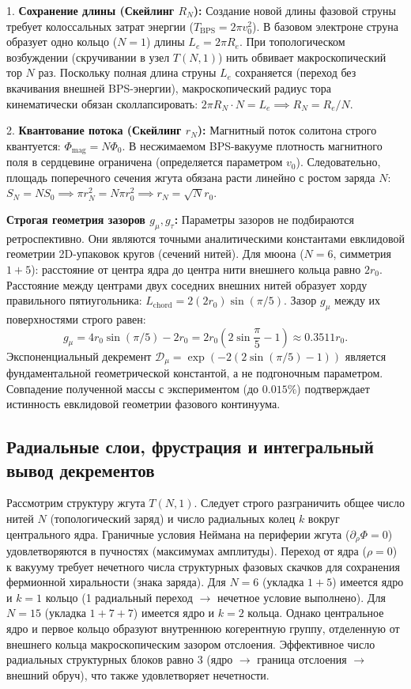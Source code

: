 \documentclass[12pt,a4paper]{article}
\begin{document}
1. \textbf{Сохранение длины (Скейлинг $R_N$):} Создание новой длины фазовой струны требует колоссальных затрат энергии ($T_{\text{BPS}} = 2\pi v_0^2$). В базовом электроне струна образует одно кольцо ($N=1$) длины $L_e = 2\pi R_e$. При топологическом возбуждении (скручивании в узел $T(N,1)$) нить обвивает макроскопический тор $N$ раз. Поскольку полная длина струны $L_e$ сохраняется (переход без вкачивания внешней BPS-энергии), макроскопический радиус тора кинематически обязан сколлапсировать: $2\pi R_N \cdot N = L_e \implies R_N = R_e/N$.

2. \textbf{Квантование потока (Скейлинг $r_N$):} Магнитный поток солитона строго квантуется: $\Phi_{\text{mag}} = N \Phi_0$. В несжимаемом BPS-вакууме плотность магнитного поля в сердцевине ограничена (определяется параметром $v_0$). Следовательно, площадь поперечного сечения жгута обязана расти линейно с ростом заряда $N$: $S_N = N S_0 \implies \pi r_N^2 = N \pi r_0^2 \implies r_N = \sqrt{N} r_0$.

\textbf{Строгая геометрия зазоров $g_\mu, g_\tau$:}
Параметры зазоров не подбираются ретроспективно. Они являются точными аналитическими константами евклидовой геометрии 2D-упаковок кругов (сечений нитей).
Для мюона ($N=6$, симметрия $1+5$): расстояние от центра ядра до центра нити внешнего кольца равно $2r_0$. Расстояние между центрами двух соседних внешних нитей образует хорду правильного пятиугольника: $L_{\text{chord}} = 2 (2r_0) \sin(\pi/5)$. Зазор $g_\mu$ между их поверхностями строго равен:
\begin{equation}
g_\mu = 4r_0 \sin(\pi/5) - 2r_0 = 2r_0 \left( 2\sin\frac{\pi}{5} - 1 \right) \approx 0.3511 r_0.
\end{equation}
Экспоненциальный декремент $\mathcal{D}_\mu = \exp(-2(2\sin(\pi/5)-1))$ является фундаментальной геометрической константой, а не подгоночным параметром. Совпадение полученной массы с экспериментом (до $0.015\%$) подтверждает истинность евклидовой геометрии фазового континуума.

\subsection{Радиальные слои, фрустрация и интегральный вывод декрементов}
Рассмотрим структуру жгута $T(N,1)$. Следует строго разграничить общее число нитей $N$ (топологический заряд) и число радиальных колец $k$ вокруг центрального ядра. 
Граничные условия Неймана на периферии жгута ($\partial_\rho \Phi = 0$) удовлетворяются в пучностях (максимумах амплитуды). Переход от ядра ($\rho=0$) к вакууму требует нечетного числа структурных фазовых скачков для сохранения фермионной хиральности (знака заряда).
Для $N=6$ (укладка $1+5$) имеется ядро и $k=1$ кольцо (1 радиальный переход $\to$ нечетное условие выполнено).
Для $N=15$ (укладка $1+7+7$) имеется ядро и $k=2$ кольца. Однако центральное ядро и первое кольцо образуют внутреннюю когерентную группу, отделенную от внешнего кольца макроскопическим зазором отслоения. Эффективное число радиальных структурных блоков равно 3 (ядро $\to$ граница отслоения $\to$ внешний обруч), что также удовлетворяет нечетности.
\end{document}
